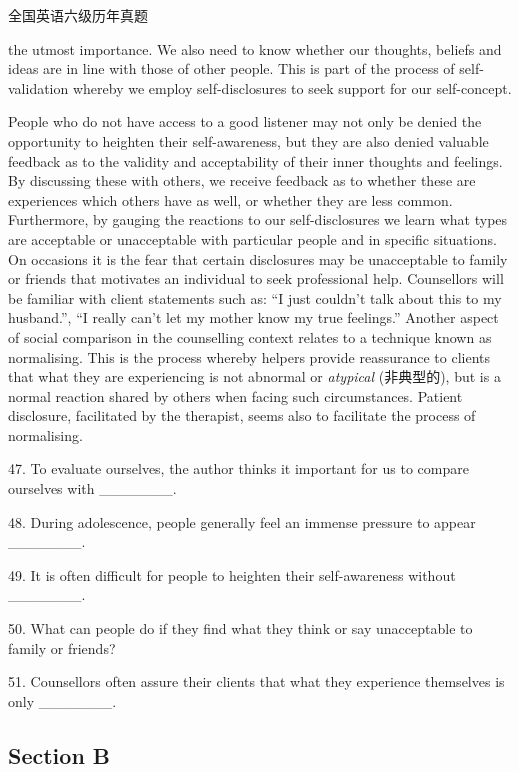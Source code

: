 \documentclass[UTF8,11pt]{ctexart}
\begin{document}
全国英语六级历年真题


the utmost importance. We also need to know whether our thoughts, beliefs and ideas are in line with those of other people. This is part of the process of self-validation whereby we employ self-disclosures to seek support for our self-concept.


People who do not have access to a good listener may not only be denied the opportunity to heighten their self-awareness, but they are also denied valuable feedback as to the validity and acceptability of their inner thoughts and feelings. By discussing these with others, we receive feedback as to whether these are experiences which others have as well, or whether they are less common. Furthermore, by gauging the reactions to our self-disclosures we learn what types are acceptable or unacceptable with particular people and in specific situations. On occasions it is the fear that certain disclosures may be unacceptable to family or friends that motivates an individual to seek professional help. Counsellors will be familiar with client statements such as: “I just couldn’t talk about this to my husband.”, “I really can’t let my mother know my true feelings.” Another aspect of social comparison in the counselling context relates to a technique known as normalising. This is the process whereby helpers provide reassurance to clients that what they are experiencing is not abnormal or\textit{ atypical} (非典型的), but is a normal reaction shared by others when facing such circumstances. Patient disclosure, facilitated by the therapist, seems also to facilitate the process of normalising.


47. To evaluate ourselves, the author thinks it important for us to compare ourselves with \_\_\_\_\_\_\_.


48. During adolescence, people generally feel an immense pressure to appear \_\_\_\_\_\_\_.


49. It is often difficult for people to heighten their self-awareness without \_\_\_\_\_\_\_.


50. What can people do if they find what they think or say unacceptable to family or friends?


51. Counsellors often assure their clients that what they experience themselves is only \_\_\_\_\_\_\_.


\subsection*{\textbf{Section B}}
\end{document}
